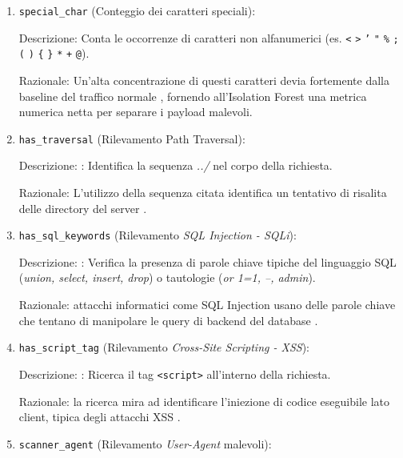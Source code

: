 \begin{enumerate}
            \begin{enumerate}
                  \item \texttt{special\_char} (Conteggio dei caratteri speciali):

                        Descrizione: Conta le occorrenze di caratteri non alfanumerici (es. \texttt{<} \texttt{>} \texttt{'} \texttt{"} \texttt{\%} \texttt{;} \texttt{(} \texttt{)} \texttt{\{} \texttt{\}} \texttt{*} \texttt{+} \texttt{@}).

                        Razionale: Un'alta concentrazione di questi caratteri devia fortemente dalla baseline del traffico normale \parencite{kruegel2003anomaly}, fornendo all'Isolation Forest una metrica numerica netta per separare i payload malevoli.

                  \item \texttt{has\_traversal} (Rilevamento Path Traversal):

                        Descrizione: : Identifica la sequenza  \emph{../} nel corpo della richiesta.

                        Razionale: L’utilizzo della sequenza citata identifica un tentativo di risalita delle directory del server \parencite{owasp2021a01} \parencite{mitre_cwe22}.
                  \item \texttt{has\_sql\_keywords} (Rilevamento \emph{SQL Injection - SQLi}):

                        Descrizione: : Verifica la presenza di parole chiave tipiche del linguaggio SQL (\emph{union, select, insert, drop}) o tautologie (\emph{or 1=1, --, admin}).

                        Razionale: attacchi informatici come SQL Injection usano delle parole chiave che tentano di manipolare le query di backend del database \parencite{owasp2021a03}.

                  \item \texttt{has\_script\_tag} (Rilevamento \emph{Cross-Site Scripting - XSS}):

                        Descrizione: : Ricerca il tag \texttt{<script>} all’interno della richiesta.

                        Razionale: la ricerca mira ad identificare l’iniezione di codice eseguibile lato client, tipica degli attacchi XSS \parencite{owasp2021a03}.

                  \item \texttt{scanner\_agent} (Rilevamento \emph{User-Agent} malevoli):


\end{enumerate}
\end{enumerate}
